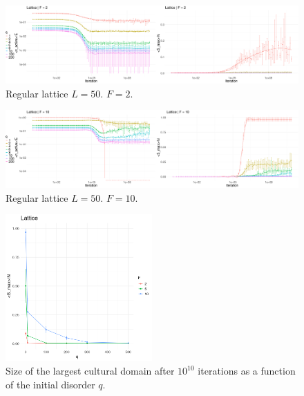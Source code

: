 \begin{figure}[h] 
    \centering
    \includegraphics[width=1\textwidth]{images/task30/resultsLattice_2.png} 
    \vspace{-0.5cm}
    \caption{Regular lattice $L=50$. $F=2$.} 
\end{figure}


\begin{figure}[h] 
    \centering
    \includegraphics[width=1\textwidth]{images/task30/resultsLattice_10.png}
    \vspace{-0.5cm}
    \caption{Regular lattice $L=50$. $F=10$.} 
\end{figure}


\begin{figure}[h] 
    \centering
    \includegraphics[width=0.5\textwidth]{images/task30/transitionLatice.png} 
    \vspace{-0.5cm}
    \caption{Size of the largest cultural domain after $10^{10}$ iterations as a function of the initial disorder $q$.} 
\end{figure}
